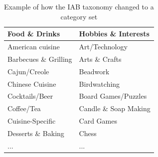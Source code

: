 \begin{table}[h]
\centering
\begin{tabular}{l|l}
\textbf{Food \& Drinks} & \textbf{Hobbies \& Interests} \\ \hline
American cuisine & Art/Technology\\
Barbecues \& Grilling & Arts \& Crafts\\
Cajun/Creole & Beadwork \\
Chinese Cuisine & Birdwatching\\
Cocktails/Beer & Board Games/Puzzles\\
Coffee/Tea & Candle \& Soap Making\\
Cuisine-Specific & Card Games\\
Desserts \& Baking & Chess \\
... & ...
\end{tabular}
\caption{Example of how the IAB taxonomy changed to a category set}
\label{tab:taxonomyascategories}
\end{table}








